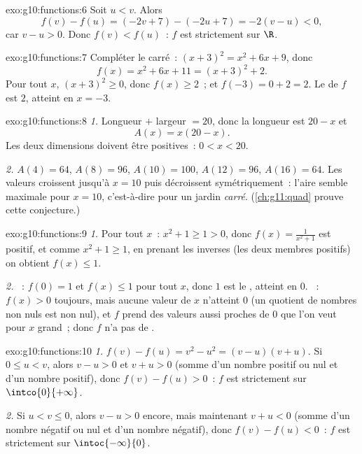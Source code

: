 \begin{solution}{exo:g10:functions:6}
Soit $u < v$. Alors
\[
f(v) - f(u) = (-2v + 7) - (-2u + 7) = -2(v - u) < 0,
\]
car $v - u > 0$. Donc $f(v) < f(u)$~: $f$ est strictement 
sur $\R$.
\end{solution}

\begin{solution}{exo:g10:functions:7}
Compléter le carré~: $(x+3)^2 = x^2 + 6x + 9$, donc
\[
f(x) = x^2 + 6x + 11 = (x + 3)^2 + 2 .
\]
Pour tout $x$, $(x+3)^2 \geq 0$, donc $f(x) \geq 2$~; et
$f(-3) = 0 + 2 = 2$. Le  de $f$ est $2$, atteint en $x = -3$.
\end{solution}

\begin{solution}{exo:g10:functions:8}
\emph{1.} Longueur $+$ largeur $= 20$, donc la longueur est $20 - x$ et
\[
A(x) = x(20 - x).
\]
Les deux dimensions doivent être positives~: $0 < x < 20$.

\emph{2.} $A(4) = 64$, $A(8) = 96$, $A(10) = 100$, $A(12) = 96$,
$A(16) = 64$. Les valeurs croissent jusqu'à $x = 10$ puis décroissent
symétriquement~: l'aire semble maximale pour $x = 10$, c'est-à-dire pour
un jardin \emph{carré}. (\cref{ch:g11:quad} prouve cette conjecture.)
\end{solution}

\begin{solution}{exo:g10:functions:9}
\emph{1.} Pour tout $x$~: $x^2 + 1 \geq 1 > 0$, donc
$f(x) = \frac{1}{x^2+1}$ est positif, et comme $x^2 + 1 \geq 1$, en
prenant les inverses (les deux membres positifs) on obtient
$f(x) \leq 1$.

\emph{2.} ~: $f(0) = 1$ et $f(x) \leq 1$ pour tout $x$, donc $1$
est le , atteint en $0$. ~: $f(x) > 0$ toujours, mais
aucune valeur de $x$ n'atteint $0$ (un quotient de nombres non nuls est
non nul), et $f$ prend des valeurs aussi proches de $0$ que l'on veut
pour $x$ grand~; donc $f$ n'a pas de .
\end{solution}

\begin{solution}{exo:g10:functions:10}
\emph{1.} $f(v) - f(u) = v^2 - u^2 = (v-u)(v+u)$. Si $0 \leq u < v$,
alors $v - u > 0$ et $v + u > 0$ (somme d'un nombre positif ou nul et
d'un nombre positif), donc $f(v) - f(u) > 0$~: $f$ est strictement
 sur $\intco{0}{+\infty}$.

\emph{2.} Si $u < v \leq 0$, alors $v - u > 0$ encore, mais maintenant
$v + u < 0$ (somme d'un nombre négatif ou nul et d'un nombre négatif),
donc $f(v) - f(u) < 0$~: $f$ est strictement  sur
$\intoc{-\infty}{0}$.
\end{solution}

